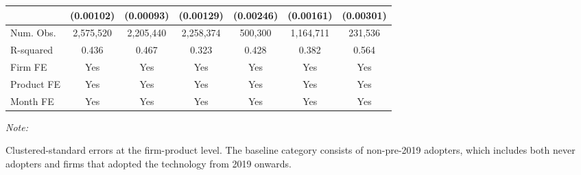 \begin{table}[H]
{\begin{threeparttable}
\begin{tabular}[t]{lcccccc}
 & (0.00102) & (0.00093) & (0.00129) & (0.00246) & (0.00161) & (0.00301)\\
\midrule
Num. Obs. & 2,575,520 & 2,205,440 & 2,258,374 & 500,300 & 1,164,711 & 231,536\\
R-squared & 0.436 & 0.467 & 0.323 & 0.428 & 0.382 & 0.564\\
Firm FE & Yes & Yes & Yes & Yes & Yes & Yes\\
Product FE & Yes & Yes & Yes & Yes & Yes & Yes\\
Month FE & Yes & Yes & Yes & Yes & Yes & Yes\\
\bottomrule
\end{tabular}
\begin{tablenotes}
\item \textit{Note: } 
\item Clustered-standard errors at the firm-product level. The baseline category consists of non-pre-2019 adopters, which includes both never adopters and firms that adopted the technology from 2019 onwards.
\end{tablenotes}
\end{threeparttable}}
\end{table}
